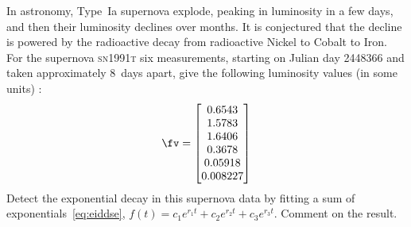 \begin{reduce}
\begin{exercise}  
In astronomy, Type~Ia supernova explode, peaking in luminosity in a few days, and then their luminosity declines over months. 
It is conjectured that the decline is powered by the radioactive decay from radioactive Nickel to Cobalt to Iron.
For the supernova \textsc{sn1991t} six measurements, starting on Julian day 2448366 and taken approximately 8~days apart, give the following luminosity values (in some units) \cite[p.146]{Pereyra2010}:
\setbox\ajrqrbox\hbox{}\marginajrbox%
\begin{equation*}
\fv=\begin{bmatrix} 0.6543
\\ 1.5783
\\ 1.6406
\\ 0.3678
\\ 0.05918
\\ 0.008227 \end{bmatrix}
\end{equation*}
Detect the exponential decay in this supernova data by fitting a sum of exponentials~\eqref{eq:eiddse}, \(f(t)=c_1e^{r_1t}+c_2e^{r_2t}+c_3e^{r_3t}\).
Comment on the result.
\end{exercise}





\end{reduce}
